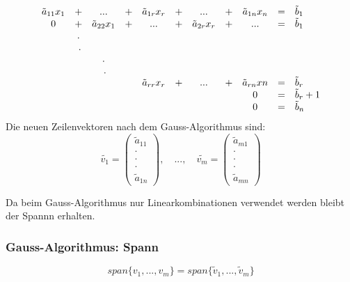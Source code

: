 \documentclass[12pt,a4paper]{article}%
\numberwithin{equation}{section}
\def\vecT#1{\left(\begin{array}{c} #1 \end{array}\right)}
\def\dddot{\cdot \\ \cdot \\ \cdot}
\def\vecDt#1#2{\vecT{#1 \\ \dddot \\ #2}}
\def\vspan#1{span \lbrace #1 \rbrace}
\numberwithin{equation}{subsection}
\begin{document}
	   \begin{align}
	     \begin{array}{c c c c c c c c c c l}
	       \tilde{a}_{11} x_1 & +   & ...                & + & \tilde{a}_{1r} x_r & + & ...                & + & \tilde{a}_{1n} x_n   & = & \tilde{b}_1\\
	       0                  & +   & \tilde{a}_{22} x_1 & + & ...                & + & \tilde{a}_{2r} x_r & + & ...                  & = & \tilde{b}_1\\
	       \;                 & .   & \;                 &\; & \;                 &\; & \;                 &\; & \;                   &\; & \;         \\
	       \;                 &\; . & \;                 &\; & \;                 &\; & \;                 &\; & \;                   &\; & \;         \\
	       \;                 &\;   & .                  &\; & \;                 &\; & \;                 &\; & \;                   &\; & \;         \\
	       \;                 &\;   & \;.                &\; & \;                 &\; & \;                 &\; & \;                   &\; & \;         \\
	       \;                 &\;   & \;                 &\, & \tilde{a}_{rr} x_r & + & ...                & + & \tilde{a}_{rn} xn    & = & \tilde{b}_r\\
	       \;                 &\;   & \;                 &\; & \;                 &\; & \;                 &\; & 0                    & = & \tilde{b}_r + 1\\ 
	       \;                 &\;   & \;                 &\; & \;                 &\; & \;                 &\; & 0                    & = & \tilde{b}_n\\
	     \end{array}
	   \end{align}
	   Die neuen Zeilenvektoren nach dem Gauss-Algorithmus sind:
	   \begin{equation}
	     \tilde{v_1} = \vecDt{\tilde{a}_{11}}{\tilde{a}_{1n}}, \quad ..., \quad \tilde{v_m} = \vecDt{\tilde{a}_{m1}}{\tilde{a}_{mn}}
	   \end{equation}
	   
	   Da beim Gauss-Algorithmus nur Linearkombinationen verwendet werden bleibt der Spannn erhalten.
	   
	   \subsubsection{Gauss-Algorithmus: Spann}
	   \begin{equation}
	     \vspan{v_1, ..., v_m} = \vspan{\tilde{v}_1,...,\tilde{v}_m}
	   \end{equation}
	   
\end{document}
